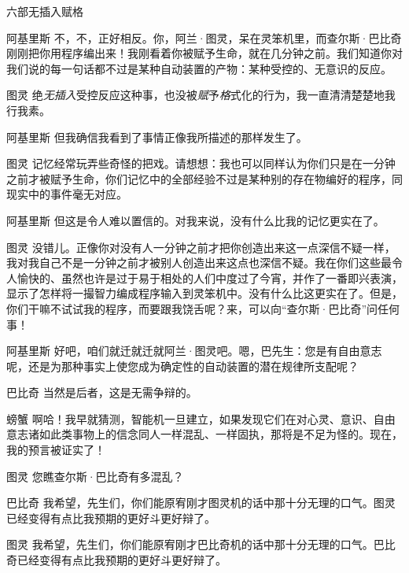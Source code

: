 \begin{dialog}{六部无插入赋格}
\begin{dialogue}
\item[阿基里斯]不，不，正好相反。你，阿兰·图灵，呆在灵笨机里，而查尔斯·巴比奇刚刚把你用程序编出来！我刚看着你被赋予生命，就在几分钟之前。我们知道你对我们说的每一句话都不过是某种自动装置的产物：某种受控的、无意识的反应。

\item[图灵]绝\emph{无插入}受控反应这种事，也没被\emph{赋}予\emph{格}式化的行为，我一直清清楚楚地我行我素。

\item[阿基里斯]但我确信我看到了事情正像我所描述的那样发生了。

\item[图灵]记忆经常玩弄些奇怪的把戏。请想想：我也可以同样认为你们只是在一分钟之前才被赋予生命，你们记忆中的全部经验不过是某种别的存在物编好的程序，同现实中的事件毫无对应。

\item[阿基里斯]但这是令人难以置信的。对我来说，没有什么比我的记忆更实在了。

\item[图灵]没错儿。正像你对没有人一分钟之前才把你创造出来这一点深信不疑一样，我对我自己不是一分钟之前才被别人创造出来这点也深信不疑。我在你们这些最令人愉快的、虽然也许是过于易于相处的人们中度过了今宵，并作了一番即兴表演，显示了怎样将一撮智力编成程序输入到灵笨机中。没有什么比这更实在了。但是，你们干嘛不试试我的程序，而要跟我饶舌呢？来，可以向“查尔斯·巴比奇”问任何事！

\item[阿基里斯]好吧，咱们就迁就迁就阿兰·图灵吧。嗯，巴先生：您是有自由意志呢，还是为那种事实上使您成为确定性的自动装置的潜在规律所支配呢？

\item[巴比奇]当然是后者，这是无需争辩的。

\item[螃蟹]啊哈！我早就猜测，智能机一旦建立，如果发现它们在对心灵、意识、自由意志诸如此类事物上的信念同人一样混乱、一样固执，那将是不足为怪的。现在，我的预言被证实了！

\item[图灵]您瞧查尔斯·巴比奇有多混乱？

\item[巴比奇]我希望，先生们，你们能原宥刚才图灵机的话中那十分无理的口气。图灵已经变得有点比我预期的更好斗更好辩了。

\item[图灵]我希望，先生们，你们能原宥刚才巴比奇机的话中那十分无理的口气。巴比奇已经变得有点比我预期的更好斗更好辩了。


\end{dialogue}
\end{dialog}
